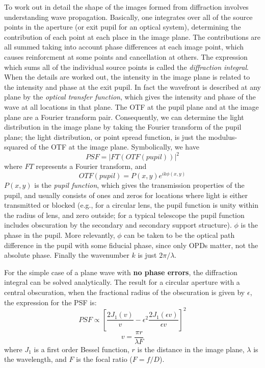 \documentclass[12pt]{article}
\begin{document}
To work out in detail the shape of the images formed from diffraction involves
understanding wave propagation. Basically, one integrates over all of the
source points in the aperture (or exit pupil for an optical system),
determining the contribution of each point at each place in the image plane.
The contributions are all summed taking into account phase differences at each
image point, which causes reinforcment at some points and cancellation at
others. The expression which sums all of the individual source points is called
the \textit{diffraction integral}. When the details are worked out, the
intensity in the image plane is related to the intensity and phase at the exit
pupil. In fact the wavefront is described at any plane by the \textit{optical
transfer function}, which gives the intensity and phase of the wave at all
locations in that plane. The OTF at the pupil plane and at the image plane are
a Fourier transform pair. Consequently, we can determine the light distribution
in the image plane by taking the Fourier transform of the pupil plane; the
light distribution, or point spread function, is just the modulus-squared of
the OTF at the image plane. Symbolically, we have
\[
    PSF = \left\vert{FT(OTF(pupil))}\right\vert^{2}
    \]
where $FT$ represents a Fourier transform, and
\[
    OTF(pupil) = P(x,y)e^{ik\phi(x,y)}
    \]
$P(x,y)$ is the \textit{pupil function}, which gives the transmission
properties of the pupil, and usually consists of ones and zeros for locations
where light is either transmitted or blocked (e.g., for a circular lens, the
pupil function is unity within the radius of lens, and zero outside; for a
typical telescope the pupil function includes obscuration by the secondary and
secondary support structure). $\phi$ is the phase in the pupil. More
relevantly, $\phi$ can be taken to be the optical path difference in the pupil
with some fiducial phase, since only OPDs matter, not the absolute phase.
Finally the wavenumber $k$ is just $2\pi/\lambda$.

For the simple case of a plane wave with \textbf{no phase errors}, the
diffraction integral can be solved analytically. The result for a
circular aperture with a central obscuration, when the fractional
radius of the obscuration is given by $\epsilon$, the expression for
the PSF is:
\[
    PSF \propto \left[
        \frac{2J_{1}(v)}{v} -
        \epsilon^{2}\frac{2J_{1}(\epsilon{v})}{\epsilon{v}}
        \right]^{2}
    \]
\[
    v = \frac{\pi{r}}{\lambda{F}}
    \]
where $J_{1}$ is a first order Bessel function, $r$ is the distance in the
image plane, $\lambda$ is the wavelength, and $F$ is the focal ratio
($F=f/D$).
\end{document}
